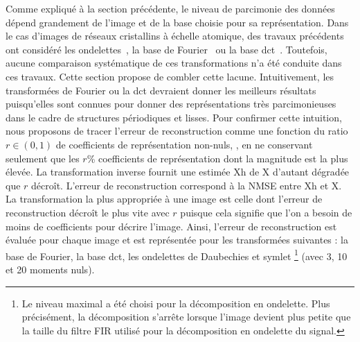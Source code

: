 Comme expliqué à la section précédente, le niveau de parcimonie des données dépend grandement de l'image et de la base choisie pour sa représentation. Dans le cas d'images de réseaux cristallins à échelle atomique, des travaux précédents ont considéré les ondelettes~\cite{li2018compressive}, la base de Fourier~\cite{stevens2018apl} ou la base \gls{dct}~\cite{beche2016development,anderson2013sparse}. Toutefois, aucune comparaison systématique de ces transformations n'a été conduite dans ces travaux. Cette section propose de combler cette lacune. Intuitivement, les transformées de Fourier ou la \gls{dct} devraient donner les meilleurs résultats puisqu'elles sont connues pour donner des représentations très parcimonieuses dans le cadre de structures périodiques et lisses. 
%
Pour confirmer cette intuition, nous proposons de tracer l'erreur de reconstruction comme une fonction du ratio $r\in(0, 1)$ de coefficients de représentation non-nuls, \ie{}, en ne conservant seulement que les $r$\% coefficients de représentation dont la magnitude est la plus élevée. La transformation inverse fournit une estimée \gls{Xh} de \gls{X} d'autant dégradée que $r$ décroît. L'erreur de reconstruction correspond à la NMSE entre \gls{Xh} et \gls{X}. La transformation la plus appropriée à une image est celle dont l'erreur de reconstruction décroît le plus vite avec $r$ puisque cela signifie que l'on a besoin de moins de coefficients pour décrire l'image.
%
Ainsi, l'erreur de reconstruction est évaluée pour chaque image et est représentée pour les transformées suivantes : la base de Fourier, la base \gls{dct}, les ondelettes de Daubechies et symlet%
%
\footnote{Le niveau maximal a été choisi pour la décomposition en ondelette. Plus précisément, la décomposition s'arrête lorsque l'image devient plus petite que la taille du filtre FIR utilisé pour la décomposition en ondelette du signal.} %
%
(avec 3, 10 et 20 moments nuls). 
%

